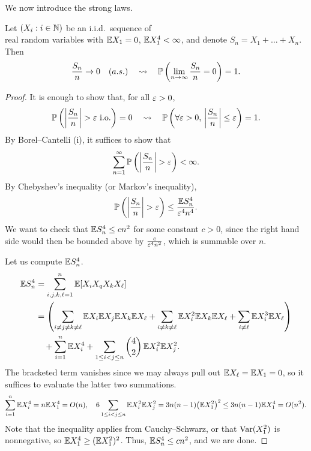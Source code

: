 We now introduce the strong laws.
\begin{theorem} \label{thm:strong_lln_1}
    Let $(X_i : i \in \mathbb N)$ be an i.i.d.\ sequence of \\ real random variables with $\mathbb E X_1 = 0$, $\mathbb E X_1^4 < \infty$, and denote $S_n = X_1 + \dots + X_n$. Then
    \[ \frac{S_n}{n} \to 0 \quad (a.s.) \quad \leadsto \quad \mathbb P\left(\lim_{n \to \infty} \frac{S_n}{n} = 0\right) = 1. \]
\end{theorem} \vspace{-8pt}
\begin{proof}
    It is enough to show that, for all $\varepsilon > 0$,
    \[ \mathbb P\left(\left\lvert \frac{S_n}{n} \right\rvert > \varepsilon \text{ i.o.}\right) = 0 \quad \leadsto \quad \mathbb P\left(\forall \varepsilon > 0, \, \left\lvert \frac{S_n}{n} \right\rvert \leq \varepsilon\right) = 1. \]
    By Borel--Cantelli (i), it suffices to show that
    \[ \sum_{n=1}^\infty \mathbb P\left(\left\lvert \frac{S_n}{n} \right\rvert > \varepsilon\right) < \infty. \]
    By Chebyshev's inequality (or Markov's inequality),
    \[ \mathbb P\left(\left\lvert \frac{S_n}{n} \right\rvert > \varepsilon\right) \leq \frac{\mathbb E S_n^4}{\varepsilon^4 n^4}. \]
    We want to check that $\mathbb E S_n^4 \leq c n^2$ for some constant $c > 0$, since the right hand side would then be bounded above by $\frac{c}{\varepsilon^4 n^2}$, which is summable over $n$.

    \newpage
    Let us compute $\mathbb E S_n^4$.
    \begin{align*}
        \mathbb E S_n^4 &= \sum_{i,j,k,\ell = 1}^n \mathbb E[X_i X_q X_k X_\ell] \\
        &= \left(\sum_{i \neq j \neq k \neq \ell} \mathbb E X_i \mathbb E X_j \mathbb E X_k \mathbb E X_\ell + \sum_{i \neq k \neq \ell} \mathbb E X_i^2 \mathbb E X_k \mathbb E X_\ell + \sum_{i \neq \ell} \mathbb E X_i^3 \mathbb E X_\ell\right) \\
        &\quad + \sum_{i=1}^n \mathbb E X_i^4 + \sum_{1 \leq i < j \leq n} \binom{4}{2} \, \mathbb E X_i^2 \mathbb E X_j^2.
    \end{align*}
    The bracketed term vanishes since we may always pull out $\mathbb E X_\ell = \mathbb E X_1 = 0$, so it suffices to evaluate the latter two summations.
    \[ \sum_{i=1}^n \mathbb E X_i^4 = n \mathbb E X_1^4 = O(n), \quad 6 \sum_{1 \leq i < j \leq n} \mathbb E X_i^2 \mathbb E X_j^2 = 3 n (n - 1) \bigl(\mathbb E X_1^2\bigr)^2 \leq 3 n(n - 1) \mathbb E X_1^4 = O(n^2). \]
    Note that the inequality applies from Cauchy--Schwarz, or that $\operatorname{Var}(X_1^2)$ is nonnegative, so $\mathbb E X_1^4 \geq (\mathbb E X_1^2)^2$. Thus, $\mathbb E S_n^4 \leq cn^2$, and we are done.
\end{proof}

